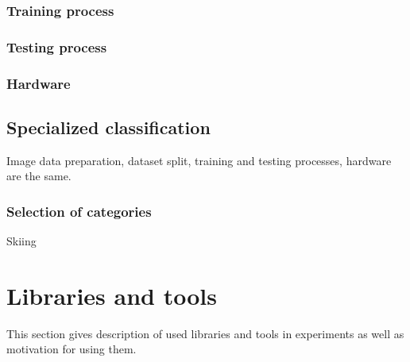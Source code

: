     \subsubsection{Training process}
    \subsubsection{Testing process}
    \subsubsection{Hardware}

\subsection{Specialized classification}
Image data preparation, dataset split, training and testing processes, hardware are the same.
    \subsubsection{Selection of categories}
    Skiing
    
\section{Libraries and tools}
This section gives description of used libraries and tools in experiments as well as motivation for using them.

